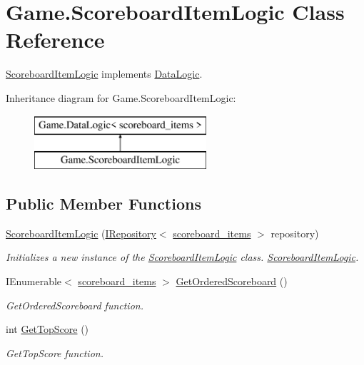 \hypertarget{class_game_1_1_scoreboard_item_logic}{}\section{Game.\+Scoreboard\+Item\+Logic Class Reference}
\label{class_game_1_1_scoreboard_item_logic}


\mbox{\hyperlink{class_game_1_1_scoreboard_item_logic}{Scoreboard\+Item\+Logic}} implements \mbox{\hyperlink{class_game_1_1_data_logic}{Data\+Logic}}.  


Inheritance diagram for Game.\+Scoreboard\+Item\+Logic\+:\begin{figure}[H]
\begin{center}
\leavevmode
\includegraphics[height=2.000000cm]{class_game_1_1_scoreboard_item_logic}
\end{center}
\end{figure}
\subsection*{Public Member Functions}
\begin{DoxyCompactItemize}
\item 
\mbox{\hyperlink{class_game_1_1_scoreboard_item_logic_a813276764b0e14eb8c3063a2683446d4}{Scoreboard\+Item\+Logic}} (\mbox{\hyperlink{interface_game_1_1_i_repository}{I\+Repository}}$<$ \mbox{\hyperlink{class_game_1_1_data_1_1scoreboard__items}{scoreboard\+\_\+items}} $>$ repository)
\begin{DoxyCompactList}\small\item\em Initializes a new instance of the \mbox{\hyperlink{class_game_1_1_scoreboard_item_logic}{Scoreboard\+Item\+Logic}} class. \mbox{\hyperlink{class_game_1_1_scoreboard_item_logic}{Scoreboard\+Item\+Logic}}. \end{DoxyCompactList}\item 
I\+Enumerable$<$ \mbox{\hyperlink{class_game_1_1_data_1_1scoreboard__items}{scoreboard\+\_\+items}} $>$ \mbox{\hyperlink{class_game_1_1_scoreboard_item_logic_a4f2a4393bc1bdfaac69ce0481def5d4a}{Get\+Ordered\+Scoreboard}} ()
\begin{DoxyCompactList}\small\item\em Get\+Ordered\+Scoreboard function. \end{DoxyCompactList}\item 
int \mbox{\hyperlink{class_game_1_1_scoreboard_item_logic_a15723a6bd6bcdeab079a2b40869b1c85}{Get\+Top\+Score}} ()
\begin{DoxyCompactList}\small\item\em Get\+Top\+Score function. \end{DoxyCompactList}\end{DoxyCompactItemize}
